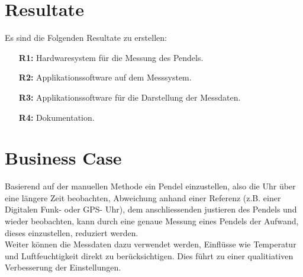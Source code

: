 \section{Resultate}
Es sind die Folgenden Resultate zu erstellen:
\begin{itemize}
	\item[\textbf{R1:}] Hardwaresystem für die Messung des Pendels.
	\item[\textbf{R2:}] Applikationssoftware auf dem Messsystem.
	\item[\textbf{R3:}] Applikationssoftware für die Darstellung der Messdaten.
	\item[\textbf{R4:}] Dokumentation.
\end{itemize}

\section{Business Case}
	Basierend auf der manuellen Methode ein Pendel einzustellen, also die Uhr über eine längere Zeit beobachten, Abweichung anhand einer Referenz (z.B. einer Digitalen Funk- oder GPS- Uhr), dem anschliessenden justieren des Pendels und wieder beobachten, kann durch eine genaue Messung eines Pendels der Aufwand, dieses einzustellen, reduziert werden.\\
	 Weiter können die Messdaten dazu verwendet werden, Einflüsse wie Temperatur und Luftfeuchtigkeit direkt zu berücksichtigen. Dies führt zu einer qualitiativen Verbesserung der Einstellungen.